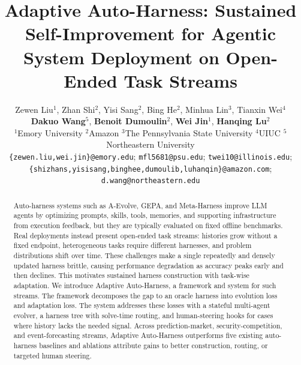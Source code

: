 \documentclass[11pt]{article}
\title{Adaptive Auto-Harness: Sustained Self-Improvement for Agentic System Deployment on Open-Ended Task Streams}
\author{Zewen Liu$^{1}$, Zhan Shi$^{2}$, Yisi Sang$^{2}$, Bing He$^{2}$, Minhua Lin$^{3}$, Tianxin Wei$^{4}$\\
\textbf{Dakuo Wang}$^{5}$, \textbf{Benoit Dumoulin}$^{2}$, \textbf{Wei Jin}$^{1}$, \textbf{Hanqing Lu}$^{2}$\\
$^{1}$Emory University $^{2}$Amazon $^{3}$The Pennsylvania State University $^{4}$UIUC $^{5}$Northeastern University \\
\texttt{\{zewen.liu,wei.jin\}@emory.edu}; \texttt{mfl5681@psu.edu}; \texttt{twei10@illinois.edu};\\
\texttt{\{shizhans,yisisang,binghee,dumoulib,luhanqin\}@amazon.com}; \texttt{d.wang@northeastern.edu}\\
}
\theoremstyle{plain}
\begin{document}
\maketitle

\begin{abstract}
Auto-harness systems such as A-Evolve, GEPA, and Meta-Harness improve LLM agents by optimizing prompts, skills, tools, memories, and supporting infrastructure from execution feedback, but they are typically evaluated on fixed offline benchmarks. Real deployments instead present open-ended task streams: histories grow without a fixed endpoint, heterogeneous tasks require different harnesses, and problem distributions shift over time. These challenges make a single repeatedly and densely updated harness brittle, causing performance degradation as accuracy peaks early and then declines. This motivates sustained harness construction with task-wise adaptation. We introduce Adaptive Auto-Harness, a framework and system for such streams. The framework decomposes the gap to an oracle harness into evolution loss and adaptation loss. The system addresses these losses with a stateful multi-agent evolver, a harness tree with solve-time routing, and human-steering hooks for cases where history lacks the needed signal. Across prediction-market, security-competition, and event-forecasting streams, Adaptive Auto-Harness outperforms five existing auto-harness baselines and ablations attribute gains to better construction, routing, or targeted human steering.
\end{abstract}












\appendix

\end{document}
